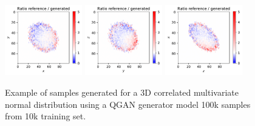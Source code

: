 \documentclass[twocolumn,preprintnumbers,superscriptaddress]{revtex4-2}
\begin{document}
\begin{figure}
  \includegraphics[width=0.3\textwidth]{plots/3Dgaussian_posdef/1-2_RATIO_100k.pdf}%
  \includegraphics[width=0.3\textwidth]{plots/3Dgaussian_posdef/2-3_RATIO_100k.pdf}%
  \includegraphics[width=0.3\textwidth]{plots/3Dgaussian_posdef/3-1_RATIO_100k.pdf}

  \caption{\label{fig:3dgauss}Example of samples generated for a 3D correlated
  multivariate normal distribution using a QGAN generator model 100k samples from 10k training set.}
\end{figure}
\end{document}
